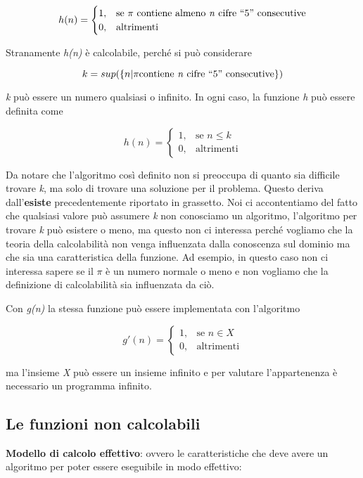 $$
h(n) = \begin{cases}
1, &\text{se $\pi$ contiene almeno \textit{n} cifre ``5'' consecutive} \\
0, &\text{altrimenti}
\end{cases}
$$

Stranamente \emph{h(n)} è calcolabile, perché si può considerare

$$
k = sup( \{n | \pi \text{contiene \textit{n} cifre ``5'' consecutive}\} )
$$

\emph{k} può essere un numero qualsiasi o infinito. In ogni caso, la
funzione \emph{h} può essere definita come


$$
h(n) = \begin{cases}
1, &\text{se }  n \leq k\\
0, &\text{altrimenti}
\end{cases}
$$

Da notare che l'algoritmo così definito non si preoccupa di quanto sia
difficile trovare \emph{k}, ma solo di trovare una soluzione per il
problema.
 Questo deriva dall'\textbf{esiste} precedentemente riportato in
grassetto.
Noi ci accontentiamo del fatto che qualsiasi valore può
assumere \emph{k} non conosciamo un algoritmo, l'algoritmo per trovare
\emph{k} può esistere o meno, ma questo non ci interessa perché vogliamo
che la teoria della calcolabilità non venga influenzata dalla conoscenza
sul dominio ma che sia una caratteristica della funzione. 
Ad esempio, in questo caso non ci interessa sapere se il $\pi$ è un numero normale o
meno e non vogliamo che la definizione di calcolabilità sia influenzata
da ciò.

Con \emph{g(n)} la stessa funzione può essere implementata con
l'algoritmo


$$
g'(n) = \begin{cases}
1, &\text{se } n \in X \\
0, &\text{altrimenti}
\end{cases}
$$

ma l'insieme \emph{X} può essere un insieme infinito e per valutare
l'appartenenza è necessario un programma infinito.

\subsection{Le funzioni non calcolabili}\label{le-funzioni-non-calcolabili}

\textbf{Modello di calcolo effettivo}: ovvero le caratteristiche che
deve avere un algoritmo per poter essere eseguibile in modo effettivo:


